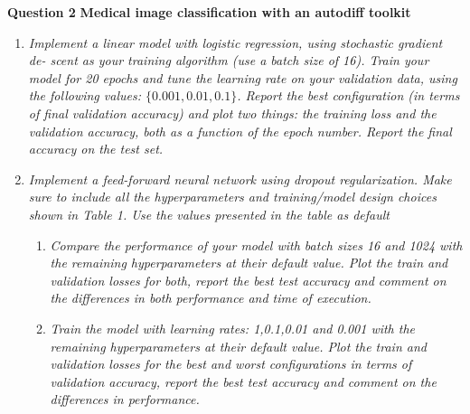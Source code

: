 \documentclass[12pt]{article}
\begin{document}
\begin{enumerate}[leftmargin=\labelsep]
\begin{enumerate}[label=\alph*)]
          \end{enumerate}

\end{enumerate}

\vspace{12pt}

\center\large{\textbf{Question 2}}
\center\textbf{Medical image classification with an autodiff toolkit}

\begin{enumerate}[leftmargin=\labelsep]
    \item \textit{Implement a linear model with logistic regression, using stochastic gradient de-
              scent as your training algorithm (use a batch size of 16). Train your model for 20 epochs and
              tune the learning rate on your validation data, using the following values: $\{0.001, 0.01, 0.1\}$.
              Report the best configuration (in terms of final validation accuracy) and plot two things: the
              training loss and the validation accuracy, both as a function of the epoch number. Report
              the final accuracy on the test set.}

    \item \textit{Implement a feed-forward neural network using dropout regularization. Make
              sure to include all the hyperparameters and training/model design choices shown in Table
              1. Use the values presented in the table as default}

          \begin{enumerate}[label=\alph*)]
              \item \textit{Compare the performance of your model with batch sizes 16 and 1024 with
                        the remaining hyperparameters at their default value. Plot the train and validation
                        losses for both, report the best test accuracy and comment on the differences in both
                        performance and time of execution.}

              \item \textit{Train the model with learning rates: 1,0.1,0.01 and 0.001 with the remaining
                        hyperparameters at their default value. Plot the train and validation losses for the best
                        and worst configurations in terms of validation accuracy, report the best test accuracy
                        and comment on the differences in performance.}


\end{enumerate}
\end{enumerate}
\end{document}
